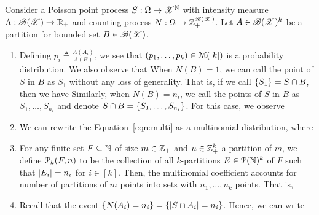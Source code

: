 \documentclass[letterpaper,10pt,english]{article}
\begin{document}
\begin{rem}
Consider a Poisson point process $S:\Omega\to\mathscr{X}^{\mathbb{N}}$ with intensity measure $\Lambda: \mathscr{B}(\mathscr{X}) \to \mathbb{R}_+$ and counting process $N:\Omega\to\mathbb{Z}_+^{\mathscr{B}(\mathscr{X})}$. 
Let $A \in \mathscr{B}(\mathscr{X})^k$ be a partition for bounded set $B \in \mathscr{B}(\mathscr{X})$.  
\begin{enumerate}[i\_]
\item Defining $p_i \triangleq \frac{\Lambda(A_i)}{\Lambda(B)}$, we see that $(p_1, \dots, p_k) \in \mathcal{M}([k])$ is a probability distribution. %
We also observe that 
When $N(B)=1$, we can call the point of $S$ in $B$ as $S_1$ without any loss of generality. 
That is, if we call $\left\{S_1\right\} = S \cap B$, then we have 
Similarly, when $N(B) = n_i$, 
we call the points of $S$ in $B$ as $S_1, \dots, S_{n_i}$ and denote $S\cap B = \left\{S_1, \dots, S_{n_i}\right\}$. 
For this case,  we observe

\item We can rewrite the Equation~\eqref{eqn:multi} as a multinomial distribution, where 

\item For any finite set $F\subseteq \mathbb{N}$ of size $m \in \mathbb{Z}_+$ and $n\in\mathbb{Z}_+^k$ a partition of $m$, 
we define $\mathcal{P}_k(F, n)$ to be the collection of all $k$-partitions $E \in \mathcal{P}(\mathbb{N})^k$ of $F$ such that $\left\lvert E_i\right\rvert = n_i$ for $i \in [k]$. 
Then, the multinomial coefficient accounts for number of partitions of $m$ points into sets with $n_1,  \dots, n_k$ points. 
That is, 

\item %
Recall that the event $\left\{N(A_i) = n_i\right\} = \left\{\left\lvert S \cap A_i\right\rvert = n_i\right\}$. 
Hence, we can write 


\end{enumerate}
\end{rem}
\end{document}
